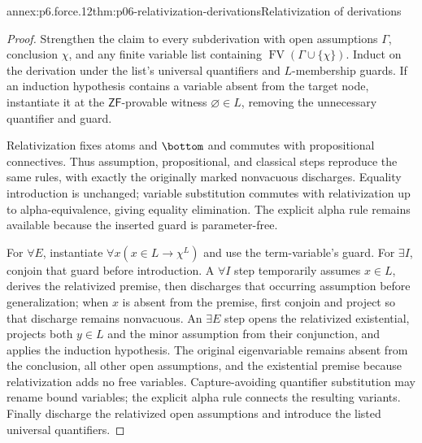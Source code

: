 \begin{annexitem}{annex:p6.force.12}{thm:p06-relativization-derivations}{Relativization of derivations}
\begin{proof}
Strengthen the claim to every subderivation with open assumptions \(\Gamma\),
conclusion \(\chi\), and any finite variable list containing
\(\operatorname{FV}(\Gamma\cup\{\chi\})\).  Induct on the derivation under
the list's universal quantifiers and \(L\)-membership guards.  If an induction
hypothesis contains a variable absent from the target node, instantiate it at
the \(\mathsf{ZF}\)-provable witness \(\varnothing\in L\), removing the
unnecessary quantifier and guard.

Relativization fixes atoms and \(\bottom\) and commutes with propositional
connectives.  Thus assumption, propositional, and classical steps reproduce
the same rules, with exactly the originally marked nonvacuous discharges.
Equality introduction is unchanged; variable substitution commutes with
relativization up to alpha-equivalence, giving equality elimination.  The
explicit alpha rule remains available because the inserted guard is
parameter-free.

For \(\forall E\), instantiate
\(\forall x(x\in L\to\chi^L)\) and use the term-variable's guard.  For
\(\exists I\), conjoin that guard before introduction.  A \(\forall I\)
step temporarily assumes \(x\in L\), derives the relativized premise, then
discharges that occurring assumption before generalization; when \(x\) is
absent from the premise, first conjoin and project so that discharge remains
nonvacuous.  An \(\exists E\) step opens the relativized existential, projects
both \(y\in L\) and the minor assumption from their conjunction, and applies
the induction hypothesis.  The original eigenvariable remains absent from the
conclusion, all other open assumptions, and the existential premise because
relativization adds no free variables.  Capture-avoiding quantifier
substitution may rename bound variables; the explicit alpha rule connects the
resulting variants.  Finally discharge the relativized open assumptions and
introduce the listed universal quantifiers.
\end{proof}
\end{annexitem}

